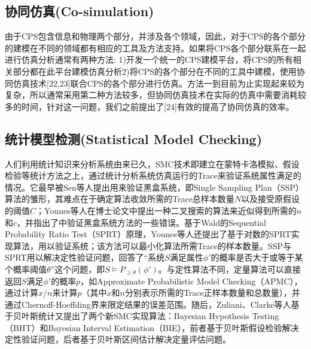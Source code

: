 \subsection{协同仿真(Co-simulation)}
由于CPS包含信息和物理两个部分，并涉及各个领域，因此，对于CPS的各个部分的建模在不同的领域都有相应的工具及方法支持。如果将CPS各个部分联系在一起进行仿真分析通常有两种方法: 1)开发一个统一的CPS建模平台，将CPS的所有相关部分都在此平台建模仿真分析2)将CPS的各个部分在不同的工具中建模，使用协同仿真技术[22,23]联合CPS的各个部分进行仿真。方法一到目前为止实现起来较为复杂，所以通常采用第二种方法较多，但协同仿真技术在实际的仿真中需要消耗较多的时间，针对这一问题，我们之前提出了[24]有效的提高了协同仿真的效率。

\subsection{统计模型检测(Statistical Model Checking)}
人们利用统计知识来分析系统由来已久，SMC技术即建立在蒙特卡洛模拟、假设检验等统计方法之上，通过统计分析系统仿真运行的Trace来验证系统属性满足的情况。它最早被Sen等人提出用来验证黑盒系统\cite{sen2004statistical}，即Single Sampling Plan（SSP）算法的雏形，其难点在于确定算法收敛所需的Trace总样本数量$N$以及接受原假设的阈值$C$；Younes等人在博士论文\cite{younes2005verification}中提出一种二叉搜索的算法来近似得到所需的$n$和$c$，并指出了\cite{sen2004statistical}中验证黑盒系统方法的一些错误。基于Wald的Sequential Probability Ratio Test（SPRT）\cite{wald1945sequential}原理，Younes等人还提出了基于对数的SPRT实现算法\cite{younes2005verification,younes2006statistical}，用以验证系统；该方法可以最小化算法所需Trace的样本数量。SSP与SPRT用以解决定性验证问题，回答了“系统$S$满足属性$\phi '$的概率是否大于或等于某个概率阈值$\theta$”这个问题，即$S \models P_{\geq \theta} (\phi ')$。与定性算法不同，定量算法可以直接返回$S$满足$\phi '$的概率$p$，如Approximate Probabilistic Model Checking（APMC）\cite{herault2004approximate}，通过计算$x/n$来计算$p$（其中$x$和$n$分别表示所需的Trace正样本数量和总数量），并通过Chernoff-Hoeffding界来限定结果的误差范围。随后，Zuliani、Clarke等人基于贝叶斯统计又提出了两个新SMC实现算法：Bayesian Hypothesis Testing（BHT）和Bayesian Interval Estimation（BIE）\cite{jha2009bayesian,zuliani2013bayesian}，前者基于贝叶斯假设检验解决定性验证问题，后者基于贝叶斯区间估计解决定量评估问题。

